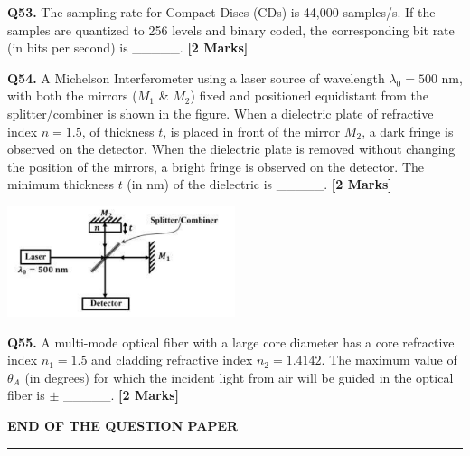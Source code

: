 \documentclass[11pt]{article}
\newcommand{\questionb}[2]{
    \noindent\textbf{Q#2.} #1 \hfill \textbf{[2 Marks]}
}
\begin{document}
\questionb{The sampling rate for Compact Discs (CDs) is 44,000 samples/s. If the samples are quantized to 256 levels and binary coded, the corresponding bit rate (in bits per second) is \_\_\_\_\_.}{53}
\vspace{0.5cm}

\questionb{A Michelson Interferometer using a laser source of wavelength \(\lambda_0 = 500\) nm, with both the mirrors (\(M_1\) \& \(M_2\)) fixed and positioned equidistant from the splitter/combiner is shown in the figure. When a dielectric plate of refractive index \(n = 1.5\), of thickness \(t\), is placed in front of the mirror \(M_2\), a dark fringe is observed on the detector. When the dielectric plate is removed without changing the position of the mirrors, a bright fringe is observed on the detector. The minimum thickness \(t\) (in nm) of the dielectric is \_\_\_\_\_.}{54}
\begin{center}
\includegraphics[width=0.5\textwidth]{figures/54.png}
\end{center}
\vspace{0.5cm}

\questionb{A multi-mode optical fiber with a large core diameter has a core refractive index \(n_1 = 1.5\) and cladding refractive index \(n_2 = 1.4142\). The maximum value of \(\theta_A\) (in degrees) for which the incident light from air will be guided in the optical fiber is \(\pm\) \_\_\_\_\_.}{55}
\vspace{5cm}

\begin{center}
\textbf{END OF THE QUESTION PAPER} \\
\rule{\textwidth}{0.5pt}
\end{center}
\end{document}
